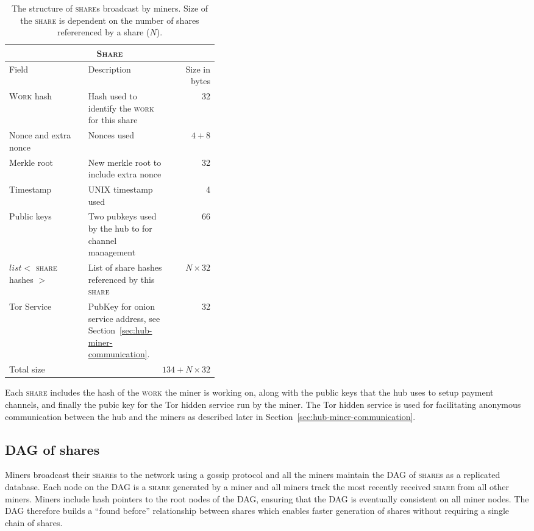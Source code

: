 \documentclass{article}
\begin{document}
\begin{table}
  \centering
  \begin{tabular}{ lp{0.4\linewidth}r }
    \multicolumn{3}{c}{\textsc{Share}} \\
    \hline
    Field & Description & Size in bytes \\
    \hline
    \textsc{Work} hash & Hash used to identify the \textsc{work} for this share & 32 \\
    Nonce and extra nonce & Nonces used & $4+8$ \\
    Merkle root & New merkle root to include extra nonce & 32 \\
    Timestamp & UNIX timestamp used & 4 \\
    Public keys & Two pubkeys used by the hub to for channel management & 66 \\
    $list<$ \textsc{share} hashes $>$ & List of share hashes referenced by this \textsc{share} & $N \times 32$ \\
    Tor Service & PubKey for onion service address, see Section~\ref{sec:hub-miner-communication}. & 32 \\
    \hline
    Total size & \multicolumn{2}{r}{$134 + N \times 32$} \\
    \hline
  \end{tabular}
  \caption{The structure of \textsc{share}s broadcast by miners. Size
    of the \textsc{share} is dependent on the number of shares
    refererenced by a share ($N$).}\label{table:share}
\end{table}

Each \textsc{share} includes the hash of the \textsc{work} the miner
is working on, along with the public keys that the hub uses to setup
payment channels, and finally the pubic key for the Tor hidden service
run by the miner. The Tor hidden service is used for facilitating
anonymous communication between the hub and the miners as described
later in Section~\ref{sec:hub-miner-communication}.

\subsection{DAG of shares}

Miners broadcast their \textsc{share}s to the network using a gossip
protocol and all the miners maintain the DAG of \textsc{share}s as a
replicated database. Each node on the DAG is a \textsc{share}
generated by a miner and all miners track the most recently received
\textsc{share} from all other miners. Miners include hash pointers to
the root nodes of the DAG, ensuring that the DAG is eventually
consistent on all miner nodes. The DAG therefore builds a ``found
before'' relationship between shares which enables faster generation
of shares without requiring a single chain of shares.
\end{document}
